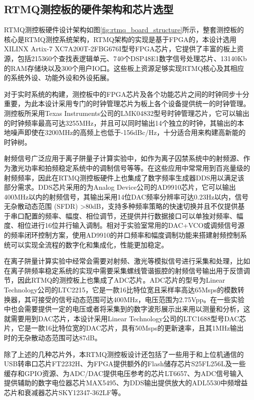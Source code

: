 \subsection[RTMQ测控板的硬件架构和芯片选型]{RTMQ测控板的硬件架构和芯片选型}

RTMQ测控板硬件设计架构如图\ref{fig:rtmq_board_structure}所示，整套测控板的核心是RTMQ测控系统架构，RTMQ架构的实现是基于FPGA的，本设计选用XILINX Artix-7 XC7A200T-2FBG676I\cite[]{7_Series_FPGAs_2020}型号FPGA芯片，它提供了丰富的板上资源，包括215360个查找表逻辑单元、740个DSP48E1数字信号处理芯片、13140Kb的RAM存储块以及300个用户IO口。这些板上资源足够实现RTMQ核心及其相应的系统外设、功能外设和外设拓展。

对于实时系统的构建，测控板中的FPGA芯片及各个功能芯片之间的时钟同步十分重要，为此本设计采用专门的时钟管理芯片为板上各个设备提供统一的时钟管理。测控板所采用Texas Instruments公司的LMK04832\cite[]{lmk04832_2018}型号时钟管理芯片，它可以输出的时钟频率最高可达3255MHz，并且可以同时输出14个独立的时钟，其输出的本地噪声即使在3200MHz的高频上也低于-156dBc/Hz，十分适合用来构建高新能的时钟树。


射频信号广泛应用于离子阱量子计算实验中，如作为离子囚禁系统中的射频源、作为激光功率和拍频稳定系统中的调制信号等等。在这些应用中常常用到百兆量级的射频频率，因此在RTMQ测控板硬件上也集成了数字频率生成器DDS用以满足该部分需求。DDS芯片采用的为Analog Device公司的AD9910\cite[]{AD9910_2020}芯片，它可以输出400MHz以内的射频信号，其输出采用14位DAC频率分辨率可达0.23Hz以内，信号无杂散动态范围 (SFDR) >80dB，支持多种频率策略的快速切换并且不仅提供基于串口配置的频率、幅度、相位调节，还提供并行数据接口可以单独对频率、幅度、相位进行16位并行输入调制。相对于实验室常用的DAC+VCO或调频信号源的频率闭环控制方案，使用AD9910的并口频率和幅度调制功能来搭建射频控制系统可以实现全流程的数字化和集成化，性能更加稳定。


在离子阱量计算实验中经常会需要对射频、激光等模拟信号进行采集和处理，比如在离子阱频率稳定系统的实现中需要采集螺线管谐振腔的射频信号输出用于反馈调节，因此RTMQ的测控板上也集成了ADC芯片。ADC芯片的型号为Linear Technology公司的LTC2215\cite[]{ADC_2020}，它是一款16比特位宽且采样率高达65Msps的模数转换器，其可接受的信号动态范围可达400MHz，电压范围为2.75Vpp。在一些实验中也会需要提供一定的电压或者将采集到的数字波形展示出来用以测量和分析，这就需要用到DAC芯片，本设计采用Linear Technology公司的LTC1688型号DAC芯片，它是一款16比特位宽的DAC芯片，具有50Msps的更新速率，且其1MHz输出时的无杂散动态范围可达87dB。

除了上述的几种芯片外，本RTMQ测控板设计还包括了一些用于和上位机通信的USB转串口芯片FT2232H\cite[]{FT2232H_2020}、为FPGA提供额外的Flash储存芯片S25FL256L\cite[]{S25FL256L_2017}及一些缓存和GPIO资源、为ADC/DAC提供电压参考的芯片LT6657\cite[]{LY6657_2020}、为ADC信号输入提供辅助的数字电位器芯片MAX5495\cite[]{MAX5495_2020}、为DDS输出提供放大的ADL5530\cite[]{ADL5530_2020}中频增益芯片和衰减器芯片SKY12347-362LF\cite[]{SKY12347_2011}等。

